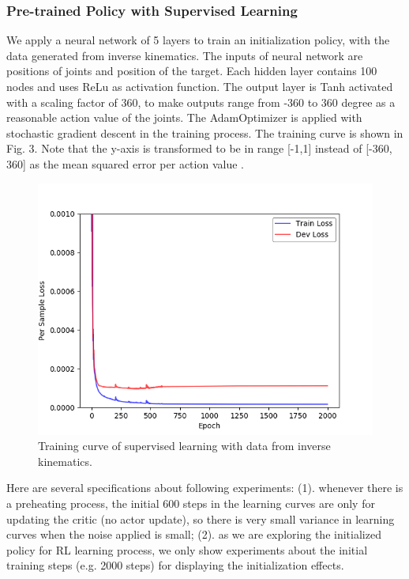 \documentclass{article}
\begin{document}
\subsubsection{Pre-trained Policy with Supervised Learning}
We apply a neural network of 5 layers to train an initialization policy, with the data generated from inverse kinematics. The inputs of neural network are positions of joints and position of the target.  Each hidden layer contains 100 nodes and uses ReLu as activation function. The output layer is Tanh activated with a scaling factor of 360, to make outputs range from -360 to 360 degree as a reasonable action value of the joints. The AdamOptimizer is applied with stochastic gradient descent in the training process. The training curve is shown in Fig. 3. Note that the y-axis is transformed to be in range [-1,1] instead of [-360, 360] as the mean squared error per action value .
\begin{figure}[htbp]
	\centering
	\includegraphics[scale=0.8]{img/supervised.png}
	\caption{Training curve of supervised learning with data from inverse kinematics.}
	\label{fig:universe}
\end{figure}

Here are several specifications about following experiments: (1). whenever there is a preheating process, the initial 600 steps in the learning curves are only for updating the critic (no actor update), so there is very small variance in learning curves when the noise applied is small; (2). as we are exploring the initialized policy for RL learning process, we only show experiments about the initial training steps (e.g. 2000 steps) for displaying the initialization effects.
\end{document}
